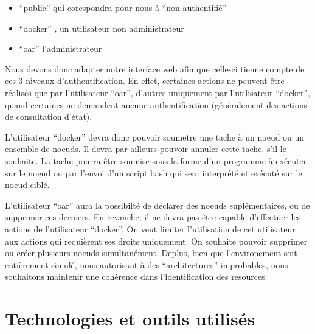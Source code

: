 \documentclass[a4paper,10pt]{article}
\begin{document}
\begin{itemize}
 \item ``public'' qui corespondra pour nous à ``non authentifié''
 \item ``docker'' , un utilisateur non administrateur
 \item ``oar'' l'administrateur
\end{itemize}
\vspace{0.5cm}
Nous devons donc adapter notre interface web afin que celle-ci tienne compte de ces 3 niveaux d'authentification.
En effet, certaines actions ne peuvent être réalisés que par l'utilisateur ``oar'', d'autres uniquement par l'utilisateur ``docker'', quand certaines ne demandent
aucune authentification (généralement des actions de consultation d'état).
\vspace{0.5cm}

L'utilisateur ``docker'' devra donc pouvoir soumetre une tache à un noeud ou un ensemble de noeuds.
Il devra par ailleurs pouvoir annuler cette tache, s'il le souhaite. La tache pourra être soumise sous la forme d'un programme à exécuter sur le noeud
ou par l'envoi d'un script bash qui sera interprêté et exécuté sur le noeud ciblé.
\vspace{0.5cm}

L'utilisateur ``oar'' aura la possibilté de déclarer des noeuds suplémentaires, ou de supprimer ces derniers. En revanche, il ne devra pas être capable d'effectuer les actions
de l'utilisateur ``docker''. On veut limiter l'utilisation de cet utilisateur aux actions qui requièrent ses droits uniquement. On souhaite pouvoir supprimer ou créer plusieurs noeuds
simultanément. Deplus, bien que l'environement soit entièrement simulé, nous autorisant à des ``architectures'' improbables, nous souhaitons maintenir une cohérence dans l'identification des resources.

\newpage
\section{Technologies et outils utilisés}
\end{document}

